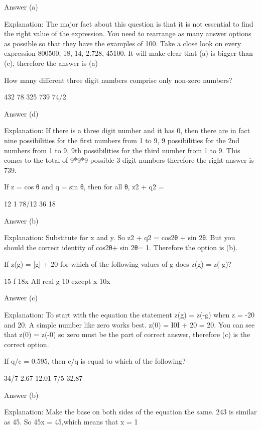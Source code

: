    Answer (a)

    Explanation: The major fact about this question is that it is not essential to find the right value of the expression. You need to rearrange as many answer options as possible so that they have the examples of 100. Take a close look on every expression 800500, 18, 14, 2.728, 45100. It will make clear that (a) is bigger than (c), therefore the answer is (a)

    How many different three digit numbers comprise only non-zero numbers?

        432
        78
        325
        739
        74/2 

    Answer (d)

    Explanation: If there is a three digit number and it has  0, then there are in fact nine possibilities for the first numbers from 1 to 9, 9 possibilities for the 2nd numbers from 1 to 9, 9th possibilities for the third number from 1 to 9. This comes to the total of 9*9*9 possible 3 digit numbers therefore the right answer is 739.

    If z = cos θ and q = sin θ, then for all θ, z2 + q2 =

        12
        1
        78/12
        36
        18 

    Answer (b)

    Explanation: Substitute for x and y. So z2 + q2 = cos2θ + sin 2θ. But you should the correct identity of cos2θ+ sin 2θ= 1. Therefore the option is (b). 




    If z(g) = |g| + 20 for which of the following values of g does z(g) = z(-g)?

        15 f
        18x
        All real g
        10 except x
        10x 

    Answer (c)

    Explanation: To start with the equation the statement z(g) = z(-g) when z = -20 and 20. A simple number like zero works best. z(0) = Ι0Ι + 20 = 20. You can see that z(0) = z(-0) so zero must be the part of correct answer, therefore (c) is the correct option.

    If q/c = 0.595, then c/q is equal to which of the following?

        34/7
        2.67
        12.01
        7/5
        32.87 

    Answer (b)

    Explanation: Make the base on both sides of the equation the same. 243 is similar as 45. So 45x = 45,which means that x = 1

